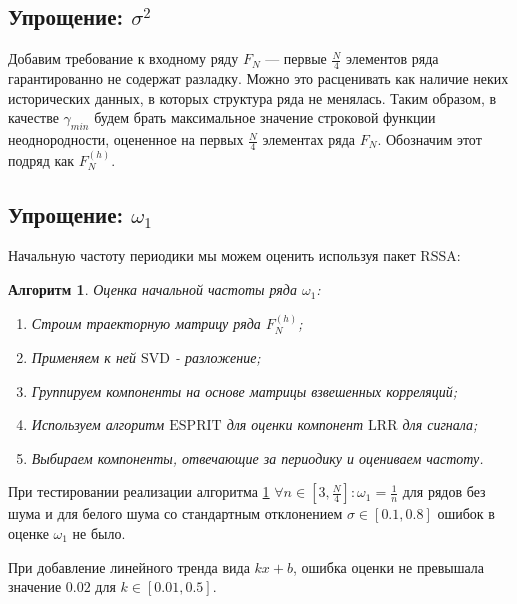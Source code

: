 \documentclass[specialist, substylefile = spbu.rtx,
			   subf, href, 12pt]{disser}
\newtheorem{algorithm}{Алгоритм}
\begin{document}
\subsection{Упрощение: $ \sigma^2 $}
Добавим требование к входному ряду $ F_N $ --- первые $ \frac{N}{4} $ элементов ряда гарантированно не содержат разладку. Можно это расценивать как наличие неких исторических данных, в которых структура ряда не менялась. Таким образом, в качестве $ \gamma_{min} $ будем брать максимальное значение строковой функции неоднородности, оцененное на первых $ \frac{N}{4} $ элементах ряда $ F_N $. Обозначим этот подряд как $ F_N^{(h)} $.

\subsection{Упрощение: $ \omega_1 $}
Начальную частоту периодики мы можем оценить используя пакет $ \mathrm{RSSA} $:
\begin{algorithm}\label{algo:estimate_omega_1}
	Оценка начальной частоты ряда $ \omega_1 $:
	\begin{enumerate}
		\item Строим траекторную матрицу ряда $ F_N^{(h)} $;
		\item Применяем к ней $ \mathrm{SVD} $ - разложение;
		\item Группируем компоненты на основе матрицы взвешенных корреляций;
		\item Используем алгоритм $ \mathrm{ESPRIT} $ для оценки компонент $ \mathrm{LRR} $ для сигнала;
		\item Выбираем компоненты, отвечающие за периодику и оцениваем частоту.	
	\end{enumerate}
\end{algorithm}

При тестировании реализации алгоритма \ref{algo:estimate_omega_1} $ \forall n \in [3, \frac{N}{4}]: \omega_1 = \frac{1}{n}$ для рядов без шума и для белого шума со стандартным отклонением $ \sigma \in [0.1, 0.8] $ ошибок в оценке $ \omega_1 $ не было. 

При добавление линейного тренда вида $ kx + b $, ошибка оценки не превышала значение $ 0.02 $ для $ k \in [0.01, 0.5] $.
\end{document}
